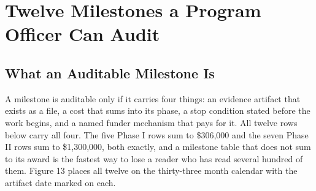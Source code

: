 \section{Twelve Milestones a Program Officer Can Audit}

\subsection{What an Auditable Milestone Is}

A milestone is auditable only if it carries four things: an evidence artifact
that exists as a file, a cost that sums into its phase, a stop condition stated
before the work begins, and a named funder mechanism that pays for it. All
twelve rows below carry all four. The five Phase I rows sum to \$306,000 and the
seven Phase II rows sum to \$1,300,000, both exactly, and a milestone table that
does not sum to its award is the fastest way to lose a reader who has read
several hundred of them. Figure 13 places all twelve on the thirty-three month
calendar with the artifact date marked on each.


